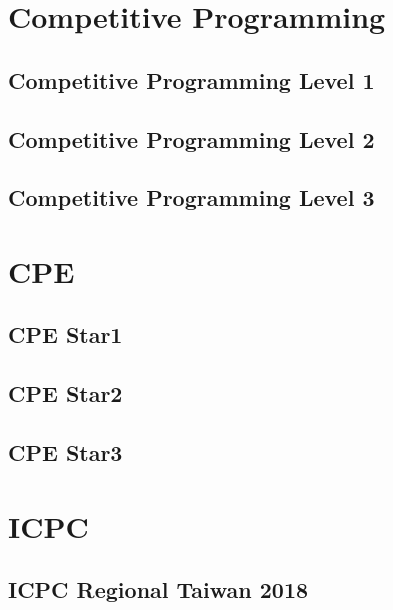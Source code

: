 \documentclass[a4paper]{report}
\begin{document}
\maketitle
\tableofcontents
\chapter{Competitive Programming}
\section{Competitive Programming Level 1}



\section{Competitive Programming Level 2}






\section{Competitive Programming Level 3}


\chapter{CPE}
\section{CPE Star1}



\section{CPE Star2}

\section{CPE Star3}

\chapter{ICPC}
\section{ICPC Regional Taiwan 2018}


\end{document}

